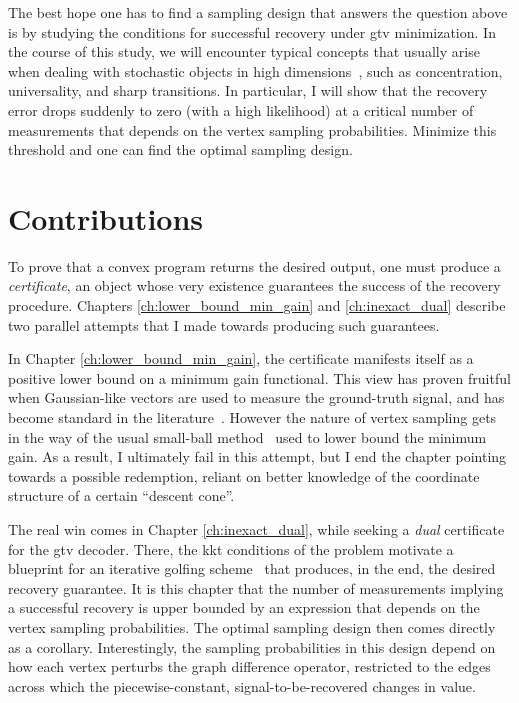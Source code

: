 \begin{center}
\end{center}

The best hope one has to find a sampling design that answers the question above is by studying the conditions for successful recovery under \acrshort{gtv} minimization. In the course of this study, we will encounter typical concepts that usually arise when dealing with stochastic objects in high dimensions~\cite[Ch. 1]{vanhandel2014}, such as concentration, universality, and sharp transitions. In particular, I will show that the recovery error drops suddenly to zero (with a high likelihood) at a critical number of measurements that depends on the vertex sampling probabilities. Minimize this threshold and one can find the optimal sampling design.

\section{Contributions}

To prove that a convex program returns the desired output, one must produce a \emph{certificate}, an object whose very existence guarantees the success of the recovery procedure. Chapters \ref{ch:lower_bound_min_gain} and \ref{ch:inexact_dual} describe two parallel attempts that I made towards producing such guarantees.

In Chapter \ref{ch:lower_bound_min_gain}, the certificate manifests itself as a positive lower bound on a minimum gain functional. This view has proven fruitful when Gaussian-like vectors are used to measure the ground-truth signal, and has become standard in the literature~\cite{chandrasekaran2012, tropp2015a}. However the nature of vertex sampling gets in the way of the usual small-ball method~\cite{mendelson2015, koltchinskii2015} used to lower bound the minimum gain. As a result, I ultimately fail in this attempt, but I end the chapter pointing towards a possible redemption, reliant on better knowledge of the coordinate structure of a certain ``descent cone''.

The real win comes in Chapter \ref{ch:inexact_dual}, while seeking a \emph{dual} certificate for the \acrshort{gtv} decoder. There, the \acrlong{kkt} conditions of the problem motivate a blueprint for an iterative golfing scheme~\cite{gross2011} that produces, in the end, the desired recovery guarantee. It is this chapter that the number of measurements implying a successful recovery is upper bounded by an expression that depends on the vertex sampling probabilities. The optimal sampling design then comes directly as a corollary. Interestingly, the sampling probabilities in this design depend on how each vertex perturbs the graph difference operator, restricted to the edges across which the piecewise-constant, signal-to-be-recovered changes in value.

